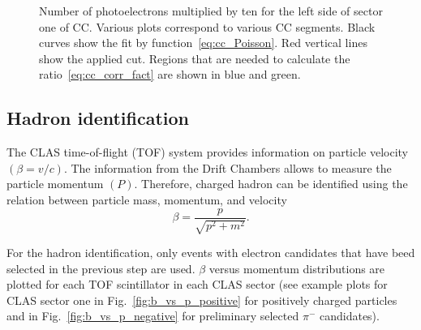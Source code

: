 

\begin{figure}[htp]
\begin{center}
\caption{\small  Number of photoelectrons multiplied by ten for the left side of sector one of CC. Various plots correspond to various CC segments. Black curves show the fit by function~\ref{eq:cc_Poisson}. Red vertical lines show the applied cut. Regions that are needed to calculate the ratio~\ref{eq:cc_corr_fact} are shown in blue and green.} \label{fig:nphe_cut}
\end{center}
\end{figure}





\subsection{Hadron identification}
\label{hadron}

The CLAS time-of-flight (TOF) system provides information on particle
velocity $(\beta= v/c)$.  The information from the Drift
Chambers allows to measure the particle momentum $(P)$. Therefore,
charged hadron can be identified using the relation between particle
mass, momentum, and velocity
\begin{equation}
\beta=\frac{p}{\sqrt{p^{2}+m^{2}}}.
\label{eq:hadron_hadronmass}
\end{equation}

For the hadron identification, only events with electron candidates that have beed selected in the previous step are used.
$\beta$ versus momentum distributions are plotted for each TOF scintillator in each CLAS sector (see example plots for CLAS sector one in Fig.~\ref{fig:b_vs_p_positive} for positively charged particles and in Fig.~\ref{fig:b_vs_p_negative} for preliminary selected $\pi^{-}$ candidates). 

